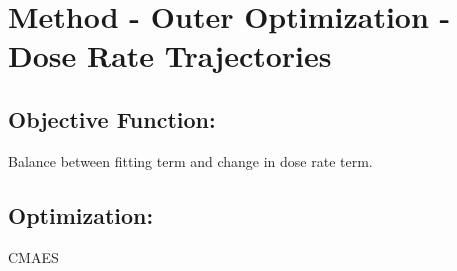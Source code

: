 





\section{Method - Outer Optimization - Dose Rate Trajectories}


\subsection{Objective Function:}

Balance between fitting term and change in dose rate term.


\subsection{Optimization:}

CMAES
